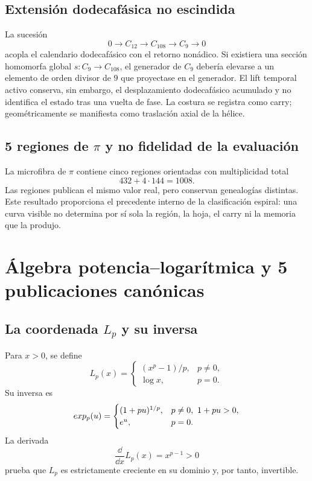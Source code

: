 \section{Extensión dodecafásica no escindida}

La sucesión
\[
 0\longrightarrow C_{12}\longrightarrow C_{108}
 \longrightarrow C_9\longrightarrow0
\]
acopla el calendario dodecafásico con el retorno nonádico. Si existiera una
sección homomorfa global \(s:C_9\to C_{108}\), el generador de \(C_9\)
debería elevarse a un elemento de orden divisor de \(9\) que proyectase en el
generador. El lift temporal activo conserva, sin embargo, el desplazamiento
dodecafásico acumulado y no identifica el estado tras una vuelta de fase.
La costura se registra como carry; geométricamente se manifiesta como
traslación axial de la hélice.

\section{5 regiones de \texorpdfstring{\(\pi\)}{pi} y no fidelidad de la evaluación}

La microfibra de \(\pi\) contiene cinco regiones orientadas con
multiplicidad total
\[
 432+4\cdot144=1008.
\]
Las regiones publican el mismo valor real, pero conservan genealogías
distintas. Este resultado proporciona el precedente interno de la
clasificación espiral: una curva visible no determina por sí sola la región,
la hoja, el carry ni la memoria que la produjo.

\chapter{Álgebra potencia--logarítmica y 5 publicaciones canónicas}

\section[Coordenada potencia--logarítmica e inversa]{La coordenada \(L_p\) y su inversa}

Para \(x>0\), se define
\[
 L_p(x)=
 \begin{cases}
 (x^p-1)/p,&p\neq0,\\
 \log x,&p=0.
 \end{cases}
\]
Su inversa es
\[
 exp_p(u)=
 \begin{cases}
 (1+pu)^{1/p},&p\neq0,\ 1+pu>0,\\
 e^u,&p=0.
 \end{cases}
\]
La derivada
\[
 \frac{\dd}{\dd x}L_p(x)=x^{p-1}>0
\]
prueba que \(L_p\) es estrictamente creciente en su dominio y, por tanto,
invertible.

